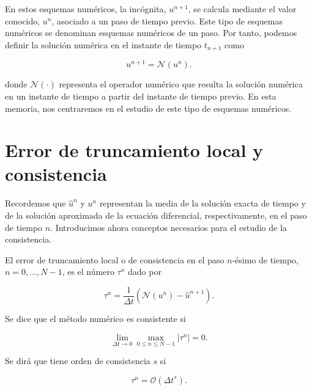 En estos esquemas numéricos, la incógnita, $u^{n+1}$, se calcula
mediante el valor conocido, $u^{n}$, asociado a un paso de tiempo
previo.
Este tipo de esquemas numéricos se denominan esquemas numéricos de un
paso.
Por tanto, podemos definir la solución numérica en el instante de
tiempo $t_{n+1}$ como

\begin{equation*}
  u^{n+1}=
  \mathcal{N}\left(u^{n}\right).
\end{equation*}

donde $\mathcal{N}\left(\cdot\right)$ representa el operador numérico
que resulta la solución numérica en un instante de tiempo a partir
del instante de tiempo previo.
En esta memoria, nos centraremos en el estudio de este tipo de
esquemas numéricos.

\section{Error de truncamiento local y consistencia}

Recordemos que $\widehat{u}^{n}$ y $u^{n}$ representan la media de la
solución exacta de tiempo y de la solución aproximada de la ecuación
diferencial, respectivamente, en el paso de tiempo $n$.
Introducimos ahora conceptos necesarios para el estudio de la
consistencia.

\begin{definition}
  El error de truncamiento local o de consistencia en el paso
  $n$-ésimo de tiempo, $n=0,\dotsc,N-1$, es el número $\tau^{n}$ dado
  por

  \begin{equation*}
    \tau^{n}=
    \frac{1}{\Delta t}
    \left(
    \mathcal{N}\left(u^{n}\right)-
    \widehat{u}^{n+1}
    \right).
  \end{equation*}
\end{definition}

\begin{definition}
  Se dice que el método numérico es consistente si

  \begin{equation*}
    \lim_{\Delta t\to0}
    \max_{0\leq n\leq N-1}
    \left|\tau^{n}\right|
    =0.
  \end{equation*}

  Se dirá que tiene orden de consistencia $s$ si

  \begin{equation*}
    \tau^{n}=
    \mathcal{O}
    \left({\Delta t}^{s}\right).
  \end{equation*}
\end{definition}

